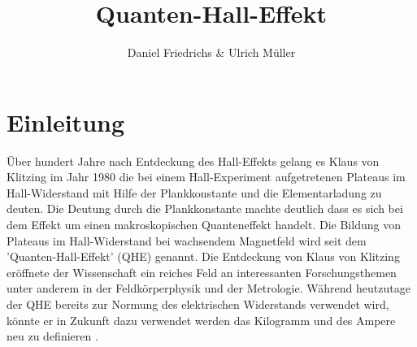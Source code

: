 \documentclass[paper=a4,fontsize=10pt,DIV=18,twocolumn,parskip=half]{scrartcl}
\numberwithin{equation}{section}    %
\begin{document}
\title{Quanten-Hall-Effekt}                  
\author{Daniel Friedrichs \& Ulrich Müller}         
\date{}                                %
%
\section{Einleitung}
\label{Einleitung}
Über hundert Jahre nach Entdeckung des Hall-Effekts gelang es Klaus von Klitzing im Jahr 1980 die bei einem Hall-Experiment aufgetretenen Plateaus im Hall-Widerstand mit Hilfe der Plankkonstante und die Elementarladung zu deuten. Die Deutung durch die Plankkonstante machte deutlich dass es sich bei dem Effekt um einen makroskopischen Quanteneffekt handelt. Die Bildung von Plateaus im Hall-Widerstand bei wachsendem Magnetfeld wird seit dem 'Quanten-Hall-Effekt' (QHE) genannt. Die Entdeckung von Klaus von Klitzing eröffnete der Wissenschaft ein reiches Feld an interessanten Forschungsthemen unter anderem in der Feldkörperphysik und der Metrologie. Während heutzutage der QHE bereits zur Normung des elektrischen Widerstands verwendet wird, könnte er in Zukunft dazu verwendet werden das Kilogramm und des Ampere neu zu definieren \cite{janssen}. 
\end{document}
